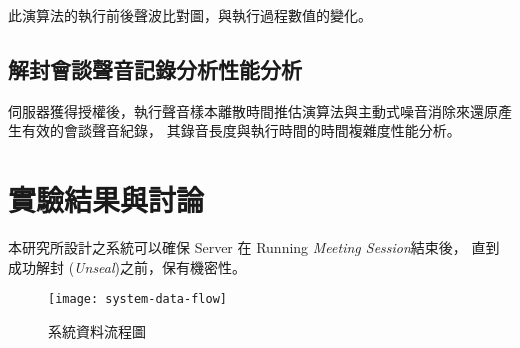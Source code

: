     此演算法的執行前後聲波比對圖，與執行過程數值的變化。


\subsection{解封會談聲音記錄分析性能分析}

    伺服器獲得授權後，執行聲音樣本離散時間推估演算法與主動式噪音消除來還原產生有效的會談聲音紀錄，
其錄音長度與執行時間的時間複雜度性能分析。


\section{實驗結果與討論}

    本研究所設計之系統可以確保 Server 在 Running {\it Meeting Session}結束後，
直到成功解封 ({\it Unseal})之前，\DEFrecREV 保有機密性。

\begin{figure}[H]
    \centering
    \texttt{[image: system-data-flow]}
    \caption{系統資料流程圖}\label{fig:system-data-flow}
\end{figure}